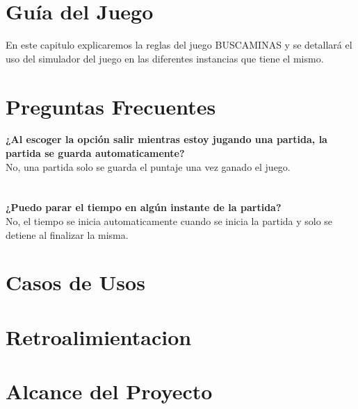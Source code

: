 \documentclass[12pt,oneside]{book}
\begin{document}
\chapter{Guía del Juego}

En este capitulo explicaremos la reglas del juego BUSCAMINAS y se detallar\'a el uso del simulador del juego en las diferentes instancias que tiene el mismo. 




\chapter{Preguntas Frecuentes}

\begin{center}
\textbf{¿Al escoger la opción salir mientras estoy jugando una partida, la partida se guarda automaticamente?} \\ No, una partida solo se guarda el puntaje una vez ganado el juego.
\ \\ \ \\ \ \\

\textbf{¿Puedo parar el tiempo en algún instante de la partida?} \\ No, el tiempo se inicia automaticamente cuando se inicia la partida y solo se detiene al finalizar la misma.
\end{center}



\chapter{Casos de Usos}


\chapter{Retroalimientacion}


\chapter{Alcance del Proyecto}

\end{document}
